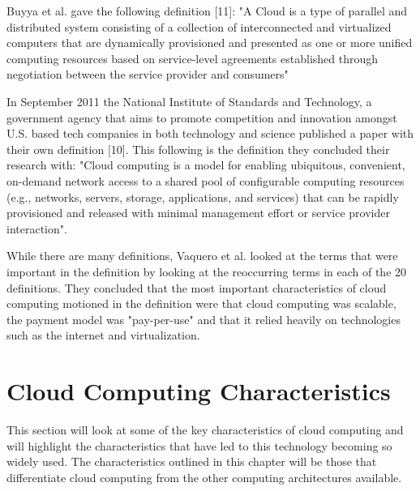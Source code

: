\documentclass[oneside,12pt]{Classes/RoboticsLaTeX}
\begin{document}
Buyya et al. gave the following definition [11]: "A Cloud is a type of parallel and distributed system consisting of a collection of interconnected and virtualized computers that are dynamically provisioned and presented as one or more unified computing resources based on service-level agreements established through negotiation between the service provider and consumers"

In September 2011 the National Institute of Standards and Technology, a government agency that aims to promote competition and innovation amongst U.S. based tech companies in both technology and science published a paper with their own definition [10]. This following is the definition they concluded their research with: "Cloud computing is a model for enabling ubiquitous, convenient, on-demand network access to a shared pool of configurable computing resources (e.g., networks, servers, storage, applications, and services) that can be rapidly provisioned and released with minimal management effort or service provider interaction".

While there are many definitions, Vaquero et al. looked at the terms that were important in the definition by looking at the reoccurring terms in each of the 20 definitions. They concluded that the most important characteristics of cloud computing motioned in the definition were that cloud computing was scalable, the payment model was "pay-per-use" and that it relied heavily on technologies such as the internet and virtualization.

\section{Cloud Computing Characteristics}
This section will look at some of the key characteristics of cloud computing and will highlight the characteristics that have led to this technology becoming so widely used. The characteristics outlined in this chapter will be those that differentiate cloud computing from the other computing architectures available. 
\end{document}
